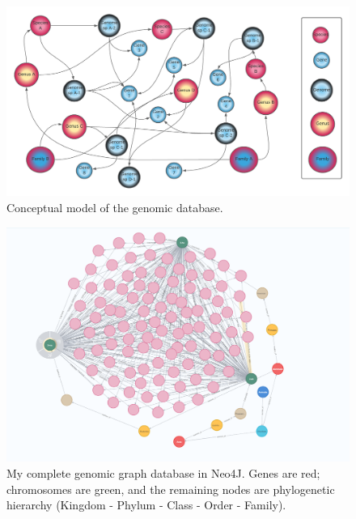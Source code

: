 \documentclass[]{article}
\begin{document}
\begin{figure}[!h]
	\includegraphics[scale=0.70]{graph model}
	\caption{Conceptual model of the genomic database.}
	\label{Fig:Race}
\end{figure}

\begin{figure}[!h]
	\includegraphics[scale=0.65]{final_db}
	\caption{My complete genomic graph database in Neo4J.  Genes are red; chromosomes are green, and the remaining nodes are phylogenetic hierarchy (Kingdom - Phylum - Class - Order - Family).}
	\label{Fig:Race}
	
\end{figure}
\end{document}
